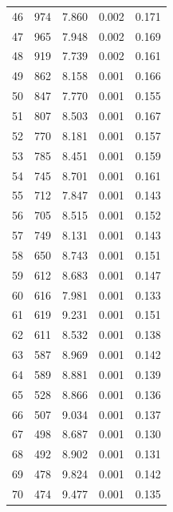 \begin{table}
\begin{tabular}{rrrrr}
  46 &    974 &          7.860 &        0.002 &           0.171 \\
  47 &    965 &          7.948 &        0.002 &           0.169 \\
  48 &    919 &          7.739 &        0.002 &           0.161 \\
  49 &    862 &          8.158 &        0.001 &           0.166 \\
  50 &    847 &          7.770 &        0.001 &           0.155 \\
  51 &    807 &          8.503 &        0.001 &           0.167 \\
  52 &    770 &          8.181 &        0.001 &           0.157 \\
  53 &    785 &          8.451 &        0.001 &           0.159 \\
  54 &    745 &          8.701 &        0.001 &           0.161 \\
  55 &    712 &          7.847 &        0.001 &           0.143 \\
  56 &    705 &          8.515 &        0.001 &           0.152 \\
  57 &    749 &          8.131 &        0.001 &           0.143 \\
  58 &    650 &          8.743 &        0.001 &           0.151 \\
  59 &    612 &          8.683 &        0.001 &           0.147 \\
  60 &    616 &          7.981 &        0.001 &           0.133 \\
  61 &    619 &          9.231 &        0.001 &           0.151 \\
  62 &    611 &          8.532 &        0.001 &           0.138 \\
  63 &    587 &          8.969 &        0.001 &           0.142 \\
  64 &    589 &          8.881 &        0.001 &           0.139 \\
  65 &    528 &          8.866 &        0.001 &           0.136 \\
  66 &    507 &          9.034 &        0.001 &           0.137 \\
  67 &    498 &          8.687 &        0.001 &           0.130 \\
  68 &    492 &          8.902 &        0.001 &           0.131 \\
  69 &    478 &          9.824 &        0.001 &           0.142 \\
  70 &    474 &          9.477 &        0.001 &           0.135 \\

\end{tabular}
\end{table}
